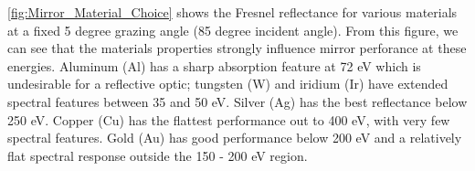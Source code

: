 %
%
%

\cref{fig:Mirror_Material_Choice} shows the Fresnel reflectance for various materials at a fixed 5 degree grazing angle (85 degree incident angle). From this figure, we can see that the materials properties strongly influence mirror perforance at these energies. Aluminum (Al) has a sharp absorption feature at 72 eV which is undesirable for a reflective optic; tungsten (W) and iridium (Ir) have extended spectral features between 35 and 50 eV. Silver (Ag) has the best reflectance below 250 eV. Copper (Cu) has the flattest performance out to 400 eV, with very few spectral features. Gold (Au) has good performance below 200 eV and a relatively flat spectral response outside the 150 - 200 eV region. 

